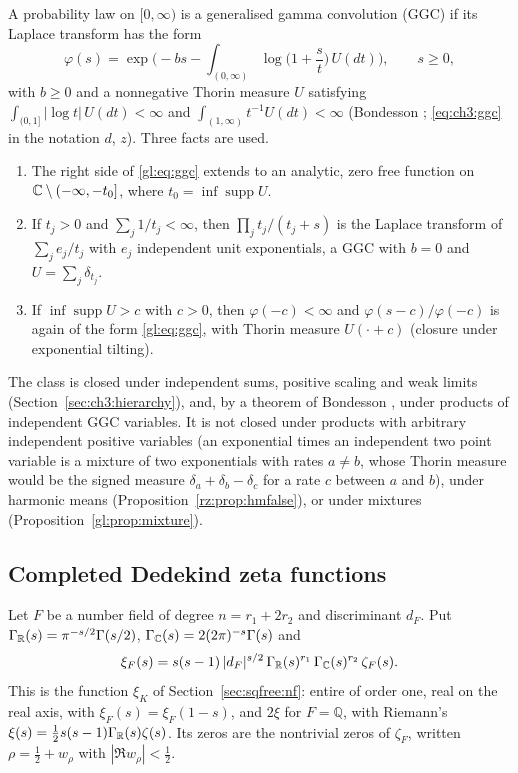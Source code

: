 A probability law on $[0,\infty)$ is a generalised gamma convolution (GGC) if its Laplace transform has the form
\begin{equation}\label{gl:eq:ggc}
\varphi(s)=\exp\Big(-bs-\int_{(0,\infty)}\log\Big(1+\frac st\Big)\,U(dt)\Big),\qquad s\ge0,
\end{equation}
with $b\ge0$ and a nonnegative Thorin measure $U$ satisfying $\int_{(0,1]}|\log t|\,U(dt)<\infty$ and $\int_{(1,\infty)}t^{-1}U(dt)<\infty$ (Bondesson \cite{Bondesson}; \eqref{eq:ch3:ggc} in the notation $d$, $z$). Three facts are used.
\begin{enumerate}
\renewcommand{\theenumi}{(G\arabic{enumi})}
\renewcommand{\labelenumi}{\theenumi}
\item\label{gl:G1} The right side of \eqref{gl:eq:ggc} extends to an analytic, zero free function on $\mathbb{C}\setminus(-\infty,-t_0]$, where $t_0=\inf\operatorname{supp}U$.
\item\label{gl:G2} If $t_j>0$ and $\sum_j1/t_j<\infty$, then $\prod_jt_j/(t_j+s)$ is the Laplace transform of $\sum_je_j/t_j$ with $e_j$ independent unit exponentials, a GGC with $b=0$ and $U=\sum_j\delta_{t_j}$.
\item\label{gl:G3} If $\inf\operatorname{supp}U>c$ with $c>0$, then $\varphi(-c)<\infty$ and $\varphi(s-c)/\varphi(-c)$ is again of the form \eqref{gl:eq:ggc}, with Thorin measure $U(\cdot+c)$ (closure under exponential tilting).
\end{enumerate}
The class is closed under independent sums, positive scaling and weak limits (Section~\ref{sec:ch3:hierarchy}), and, by a theorem of Bondesson \cite{Bond2015}, under products of independent GGC variables. It is not closed under products with arbitrary independent positive variables (an exponential times an independent two point variable is a mixture of two exponentials with rates $a\ne b$, whose Thorin measure would be the signed measure $\delta_a+\delta_b-\delta_c$ for a rate $c$ between $a$ and $b$), under harmonic means (Proposition~\ref{rz:prop:hmfalse}), or under mixtures (Proposition~\ref{gl:prop:mixture}).

\subsection{Completed Dedekind zeta functions}

Let $F$ be a number field of degree $n=r_1+2r_2$ and discriminant $d_F$. Put $\Gamma_{\mathbb{R}}(s)=\pi^{-s/2}\Gamma(s/2)$, $\Gamma_{\mathbb{C}}(s)=2(2\pi)^{-s}\Gamma(s)$ and
\begin{equation}\label{gl:eq:xiF}
\xi_F(s)=s(s-1)\,|d_F|^{s/2}\,\Gamma_{\mathbb{R}}(s)^{r_1}\,\Gamma_{\mathbb{C}}(s)^{r_2}\,\zeta_F(s).
\end{equation}
This is the function $\xi_K$ of Section~\ref{sec:sqfree:nf}: entire of order one, real on the real axis, with $\xi_F(s)=\xi_F(1-s)$, and $2\xi$ for $F=\mathbb Q$, with Riemann's $\xi(s)=\tfrac12s(s-1)\Gamma_{\mathbb{R}}(s)\zeta(s)$. Its zeros are the nontrivial zeros of $\zeta_F$, written $\rho=\tfrac12+w_\rho$ with $|\Re w_\rho|<\tfrac12$.

